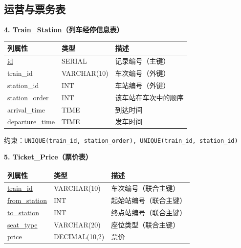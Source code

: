 \documentclass[10pt,a4paper]{article}
\begin{document}
\subsection{运营与票务表}

\textbf{4. Train\_Station（列车经停信息表）}
\begin{table}[H]
    \centering
    \begin{tabular}{lll}
        \toprule
        \textbf{列属性} & \textbf{类型} & \textbf{描述} \\
        \midrule
        \underline{id} & SERIAL & 记录编号（主键） \\
        train\_id & VARCHAR(10) & 车次编号（外键） \\
        station\_id & INT & 车站编号（外键） \\
        station\_order & INT & 该车站在车次中的顺序 \\
        arrival\_time & TIME & 到达时间 \\
        departure\_time & TIME & 发车时间 \\
        \bottomrule
    \end{tabular}
    \par 约束：\texttt{UNIQUE(train\_id, station\_order), UNIQUE(train\_id, station\_id)}
\end{table}

\textbf{5. Ticket\_Price（票价表）}
\begin{table}[H]
    \centering
    \begin{tabular}{lll}
        \toprule
        \textbf{列属性} & \textbf{类型} & \textbf{描述} \\
        \midrule
        \underline{train\_id} & VARCHAR(10) & 车次编号（联合主键） \\
        \underline{from\_station} & INT & 起始站编号（联合主键） \\
        \underline{to\_station} & INT & 终点站编号（联合主键） \\
        \underline{seat\_type} & VARCHAR(20) & 座位类型（联合主键） \\
        price & DECIMAL(10,2) & 票价 \\
        \bottomrule
    \end{tabular}
\end{table}
\end{document}

